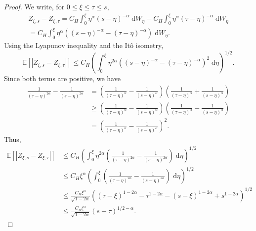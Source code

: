 \documentclass[reqno,12pt]{amsart}
\theoremstyle{plain}%
\theoremstyle{definition}
\begin{document}
\begin{proof}
    We write, for $0 \leq \xi \leq \tau \leq s$,
    \begin{multline*}
        Z_{\xi, s} - Z_{\xi, \tau} = C_H \int_0^\xi \eta^{\alpha}(s - \eta)^{-\alpha} \;\mathrm{d}W_\eta - C_H \int_0^\xi \eta^{\alpha}(\tau - \eta)^{-\alpha} \;\mathrm{d}W_\eta \\
        = C_H \int_0^\xi \eta^{\alpha}\left((s - \eta)^{-\alpha} - (\tau - \eta)^{-\alpha}\right)\;\mathrm{d}W_\eta.
    \end{multline*}
    Using the Lyapunov inequality and the It\^o isometry,
    \[
        \mathbb{E}\left[\left|Z_{\xi, s} - Z_{\xi, \tau}\right|\right] \leq C_H \left(\int_0^\xi \eta^{2\alpha}\left((s - \eta)^{-\alpha} - (\tau - \eta)^{-\alpha}\right)^2\;\mathrm{d}\eta \right)^{1/2}.
    \]
    Since both terms are positive, we have
    \begin{align*}
        \frac{1}{(\tau - \eta)^{2\alpha}} - \frac{1}{(s - \eta)^{2\alpha}} & = \left(\frac{1}{(\tau - \eta)^{\alpha}} - \frac{1}{(s - \eta)^{\alpha}}\right) \left(\frac{1}{(\tau - \eta)^{\alpha}} + \frac{1}{(s - \eta)^{\alpha}}\right)\\
        & \geq \left(\frac{1}{(\tau - \eta)^{\alpha}} - \frac{1}{(s - \eta)^{\alpha}}\right) \left(\frac{1}{(\tau - \eta)^{\alpha}} - \frac{1}{(s - \eta)^{\alpha}}\right) \\
        & = \left(\frac{1}{(\tau - \eta)^{\alpha}} - \frac{1}{(s - \eta)^{\alpha}}\right)^2.
    \end{align*}
    Thus,
    \begin{align*}
        \mathbb{E}\left[\left|Z_{\xi, s} - Z_{\xi, \tau}\right|\right] & \leq C_H \left(\int_0^\xi \eta^{2\alpha}\left(\frac{1}{(\tau - \eta)^{2\alpha}} - \frac{1}{(s - \eta)^{2\alpha}}\right)\;\mathrm{d}\eta \right)^{1/2} \\
        & \leq C_H \xi^{\alpha}\left(\int_0^\xi \left(\frac{1}{(\tau - \eta)^{2\alpha}} - \frac{1}{(s - \eta)^{2\alpha}}\right)\;\mathrm{d}\eta \right)^{1/2} \\
        & \leq \frac{C_H \xi^\alpha}{\sqrt{1 - 2\alpha}} \left((\tau - \xi)^{1 - 2\alpha} - \tau^{1-2\alpha} - (s - \xi)^{1 - 2\alpha} + s^{1 - 2\alpha}\right)^{1/2} \\
        & \leq \frac{C_H \xi^\alpha}{\sqrt{1 - 2\alpha}}\left(s - \tau\right)^{1/2 - \alpha}.
    \end{align*}
\end{proof}
\end{document}
